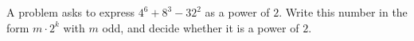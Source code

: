 A problem asks to express $4^6+8^3-32^2$ as a power of $2$. Write this number in the form $m\cdot2^k$ with $m$ odd, and decide whether it is a power of $2$.
